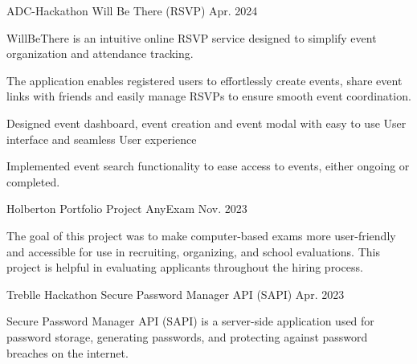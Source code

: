 \begin{cventries}
  \cventry
  {ADC-Hackathon} %
  {Will Be There (RSVP) } %
  {} %
  {Apr. 2024} %
  {
    \begin{cvitems} %
      \item {WillBeThere is an intuitive online RSVP service designed to simplify event organization and attendance tracking.}
      \item {The application enables registered users to effortlessly create events, share event links with friends and easily manage RSVPs to ensure smooth event coordination.}
      \item {Designed event dashboard, event creation and event modal with easy to use User interface and seamless User experience}
      \item {Implemented event search functionality to ease access to events, either ongoing or completed.}
    \end{cvitems}
  }
  \cventry
  {Holberton Portfolio Project} %
  {AnyExam } %
  {} %
  {Nov. 2023} %
  {
    \begin{cvitems} %
      \item {The goal of this project was to make computer-based exams more user-friendly and accessible for use in recruiting, organizing, and school evaluations. This project is helpful in evaluating applicants throughout the hiring process.}
    \end{cvitems}
  }

  \cventry
  {Treblle Hackathon} %
  {Secure Password Manager API (SAPI) } %
  {} %
  {Apr. 2023} %
  {
    \begin{cvitems} %
      \item {Secure Password Manager API (SAPI) is a server-side application used for password storage, generating passwords, and protecting against password breaches on the internet.}
    \end{cvitems}
  }

\end{cventries}
